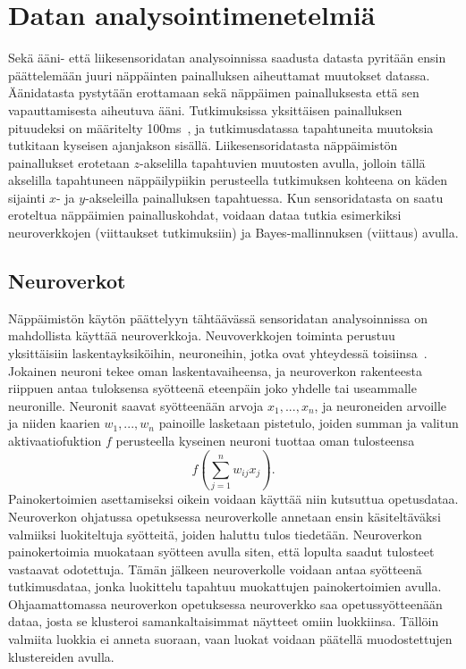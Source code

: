 \documentclass[finnish]{tktltiki2}
\theoremstyle{definition}
\theoremstyle{remark}
\begin{document}
\section{Datan analysointimenetelmiä}
Sekä ääni- että liikesensoridatan analysoinnissa saadusta datasta pyritään ensin päättelemään juuri näppäinten painalluksen aiheuttamat muutokset datassa. Äänidatasta pystytään erottamaan sekä näppäimen painalluksesta että sen vapauttamisesta aiheutuva ääni. Tutkimuksissa yksittäisen painalluksen pituudeksi on määritelty 100ms~\cite{berger}, ja tutkimusdatassa tapahtuneita muutoksia tutkitaan kyseisen ajanjakson sisällä. Liikesensoridatasta näppäimistön painallukset erotetaan $z$-akselilla tapahtuvien muutosten avulla, jolloin tällä akselilla tapahtuneen näppäilypiikin perusteella tutkimuksen kohteena on käden sijainti $x$- ja $y$-akseleilla painalluksen tapahtuessa. Kun sensoridatasta on saatu eroteltua näppäimien painalluskohdat, voidaan dataa tutkia esimerkiksi neuroverkkojen (viittaukset tutkimuksiin) ja Bayes-mallinnuksen (viittaus) avulla.

\subsection{Neuroverkot}
Näppäimistön käytön päättelyyn tähtäävässä sensoridatan analysoinnissa on mahdollista käyttää neuroverkkoja. Neuvoverkkojen toiminta perustuu yksittäisiin laskentayksiköihin, neuroneihin, jotka ovat yhteydessä toisiinsa~\cite{ert}. Jokainen neuroni tekee oman laskentavaiheensa, ja neuroverkon rakenteesta riippuen antaa tuloksensa syötteenä eteenpäin joko yhdelle tai useammalle neuronille. Neuronit saavat syötteenään arvoja $x_1,..., x_n$, ja neuroneiden arvoille ja niiden kaarien $w_1,...,w_n$ painoille lasketaan pistetulo, joiden summan ja valitun aktivaatiofuktion $f$ perusteella kyseinen neuroni tuottaa oman tulosteensa $$f(\sum_{j=1}^{n} w_{ij}x_j).$$
Painokertoimien asettamiseksi oikein voidaan käyttää niin kutsuttua opetusdataa. Neuroverkon ohjatussa opetuksessa neuroverkolle annetaan ensin käsiteltäväksi valmiiksi luokiteltuja syötteitä, joiden haluttu tulos tiedetään. Neuroverkon painokertoimia muokataan syötteen avulla siten, että lopulta saadut tulosteet vastaavat odotettuja. Tämän jälkeen neuroverkolle voidaan antaa syötteenä tutkimusdataa, jonka luokittelu tapahtuu muokattujen painokertoimien avulla. Ohjaamattomassa neuroverkon opetuksessa neuroverkko saa opetussyötteenään dataa, josta se klusteroi samankaltaisimmat näytteet omiin luokkiinsa. Tällöin valmiita luokkia ei anneta suoraan, vaan luokat voidaan päätellä muodostettujen klustereiden avulla.
\end{document}
